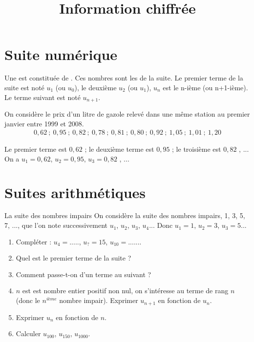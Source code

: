 \documentclass[12pt,a4paper]{article}
\date{}
\title{Information chiffrée }
\begin{document}




\section{Suite numérique}

\begin{mydef}
	Une  est constituée de . Ces nombres sont les  de la suite. Le premier terme de la suite est noté $u_1$ (ou $u_0$), le deuxième $u_2$ (ou $u_1$), $u_n$ est le n-ième (ou n+1-ième). Le terme suivant est noté $u_{n+1}$.
	
\end{mydef}

\begin{myex}
	On considère le prix d'un litre de gazole relevé dans une même station au premier janvier entre 1999 et 2008.
	\begin{align*}
		0,62 \:;\: 0,95 \:;\: 0,82 \:; \:0,78 \:;\: 0,81 \:;\: 0,80 \:;\: 0,92 \:;\: 1,05 \:;\: 1,01 \:; \:1,20
	\end{align*}
	
	Le premier terme est $0,62$ ; le deuxième terme est $0,95$ ; le troisième est $0,82$ , ...
	On a
	$u_1=0,62$, $u_2=0,95$, $u_3=0,82$ , ...
\end{myex}

\section{Suites arithmétiques}

\begin{myact}{La suite des nombres impairs}
	On considère la suite des nombres impairs, 1, 3, 5, 7, ..., que l'on note successivement $u_1$, $u_2$, $u_3$, $u_4$...
	Donc $u_1=1$, $u_2=3$, $u_3=5$...\\
	
	\begin{enumerate}
		\item Compléter : $u_4=.....$, $u_? =15$, $u_{10}=......$.
		\item Quel est le premier terme de la suite ?
		\item Comment passe-t-on d'un terme au suivant ?
		\item $n$ est est nombre entier positif non nul, on s'intéresse au terme de rang $n$ (donc le $n^{ième}$ nombre impair). Exprimer $u_{n+1}$ en fonction de $u_n$.
		\item Exprimer $u_n$ en fonction de $n$.
		\item Calculer $u_{100}$, $u_{150}$, $u_{1000}$.
	\end{enumerate}
	
\end{myact}
\end{document}
